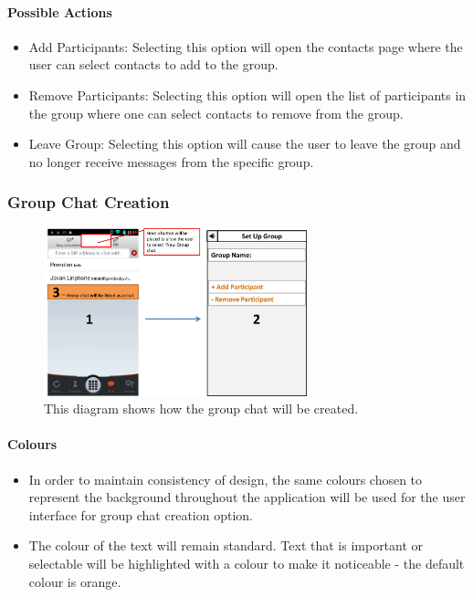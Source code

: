 \documentclass[11pt]{article}
\begin{document}
\paragraph{Possible Actions}
\begin{itemize}
\item	Add Participants: Selecting this option will open the contacts page where the user can select contacts to add to the group.
\item 	Remove Participants: Selecting this option will open the list of participants in the group where one can select contacts to remove from the group.
\item Leave Group: Selecting this option will cause the user to leave the group and no longer receive messages from the specific group.\\
\end{itemize}



\subsubsection{Group Chat Creation}
\begin{figure}[H]
\centering
\includegraphics[width=3in]{./images/CG.jpg}
\caption[Create Group Chat]{This diagram shows how the group chat will be created.}
\label{cd-cg}
\end{figure}

\paragraph{Colours}
\begin{itemize}
\item	In order to maintain consistency of design, the same colours chosen to represent the background throughout the application will be used for the user interface for group chat creation option.
\item	The colour of the text will remain standard. Text that is important or selectable will be highlighted with a colour to make it noticeable - the default colour is orange. 	\\
\end{itemize}  
               
\end{document}
